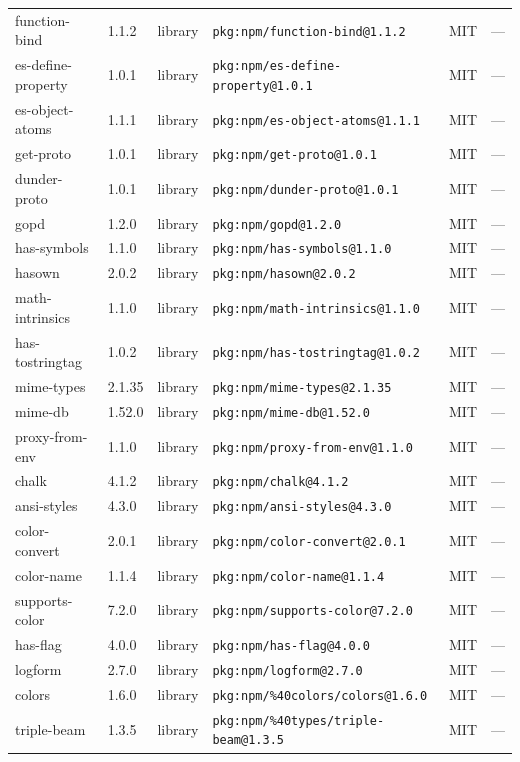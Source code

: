\documentclass[11pt]{article}
\begin{document}
\begin{longtable}{|l|l|l|p{2.2cm}|l|p{4cm}|}
function-bind & 1.1.2 & library & \texttt{pkg:npm/function-bind@1.1.2} & MIT & — \\
es-define-property & 1.0.1 & library & \texttt{pkg:npm/es-define-property@1.0.1} & MIT & — \\
es-object-atoms & 1.1.1 & library & \texttt{pkg:npm/es-object-atoms@1.1.1} & MIT & — \\
get-proto & 1.0.1 & library & \texttt{pkg:npm/get-proto@1.0.1} & MIT & — \\
dunder-proto & 1.0.1 & library & \texttt{pkg:npm/dunder-proto@1.0.1} & MIT & — \\
gopd & 1.2.0 & library & \texttt{pkg:npm/gopd@1.2.0} & MIT & — \\
has-symbols & 1.1.0 & library & \texttt{pkg:npm/has-symbols@1.1.0} & MIT & — \\
hasown & 2.0.2 & library & \texttt{pkg:npm/hasown@2.0.2} & MIT & — \\
math-intrinsics & 1.1.0 & library & \texttt{pkg:npm/math-intrinsics@1.1.0} & MIT & — \\
has-tostringtag & 1.0.2 & library & \texttt{pkg:npm/has-tostringtag@1.0.2} & MIT & — \\
mime-types & 2.1.35 & library & \texttt{pkg:npm/mime-types@2.1.35} & MIT & — \\
mime-db & 1.52.0 & library & \texttt{pkg:npm/mime-db@1.52.0} & MIT & — \\
proxy-from-env & 1.1.0 & library & \texttt{pkg:npm/proxy-from-env@1.1.0} & MIT & — \\
chalk & 4.1.2 & library & \texttt{pkg:npm/chalk@4.1.2} & MIT & — \\
ansi-styles & 4.3.0 & library & \texttt{pkg:npm/ansi-styles@4.3.0} & MIT & — \\
color-convert & 2.0.1 & library & \texttt{pkg:npm/color-convert@2.0.1} & MIT & — \\
color-name & 1.1.4 & library & \texttt{pkg:npm/color-name@1.1.4} & MIT & — \\
supports-color & 7.2.0 & library & \texttt{pkg:npm/supports-color@7.2.0} & MIT & — \\
has-flag & 4.0.0 & library & \texttt{pkg:npm/has-flag@4.0.0} & MIT & — \\
logform & 2.7.0 & library & \texttt{pkg:npm/logform@2.7.0} & MIT & — \\
colors & 1.6.0 & library & \texttt{pkg:npm/\%40colors/colors@1.6.0} & MIT & — \\
triple-beam & 1.3.5 & library & \texttt{pkg:npm/\%40types/triple-beam@1.3.5} & MIT & — \\

\end{longtable}
\end{document}
